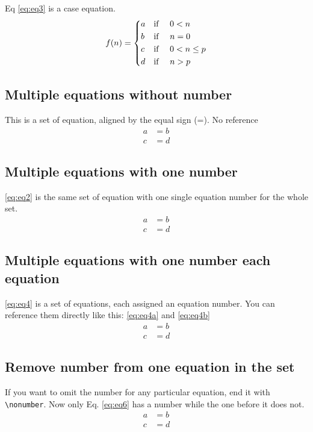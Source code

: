 Eq \ref{eq:eq3} is a case equation.
\begin{equation}
f(n) = 
\begin{dcases}
a & \text{if } \quad 0 < n\\
b & \text{if } \quad n = 0 \\
c & \text{if } \quad 0 < n \le p \\
d & \text{if } \quad n > p
\end{dcases}
\label{eq:eq3}
\end{equation}
%
\subsection{Multiple equations without number}
This is a set of equation, aligned by the equal sign (=). No reference
\begin{equation*}
\begin{aligned}
a &= b \\
c &= d
\end{aligned}
\end{equation*}
%
\subsection{Multiple equations with one number}
\ref{eq:eq2} is the same set of equation with one single equation number for the whole set.
\begin{equation}
\begin{aligned}
a &= b \\
c &= d
\end{aligned}
\label{eq:eq2}
\end{equation}

\subsection{Multiple equations with one number each equation}
\ref{eq:eq4} is a set of equations, each assigned an equation number. You can reference them directly like this: \ref{eq:eq4a} and \ref{eq:eq4b}
\begin{subequations}
  \begin{align}
  a &= b \label{eq:eq4a} \\
  c &= d \label{eq:eq4b}
  \end{align}
  \label{eq:eq4}
\end{subequations}

\subsection{Remove number from one equation in the set}
If you want to omit the number for any particular equation, end it with \verb|\nonumber|. Now only Eq. \ref{eq:eq6} has a number while the one before it does not.
\begin{align}
a &= b \nonumber\\
c &= d \label{eq:eq6}
\end{align}

